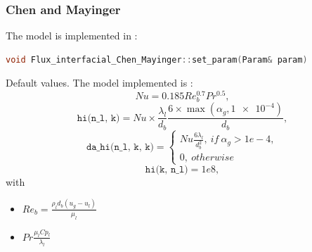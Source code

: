 \subsubsection{Chen and Mayinger}
The model is implemented in :
\begin{lstlisting}[language=c++]
void Flux_interfacial_Chen_Mayinger::set_param(Param& param)
\end{lstlisting}
Default values.
The model implemented is :
\begin{equation}
        Nu=0.185Re_b^{0.7}Pr^{0.5},
\end{equation}
\begin{equation}
    \texttt{hi(n_l, k)} = Nu\times\frac{\lambda_l}{d_b} \frac{6\times \max(\alpha_g,\num{1e-4})}{d_b},
\end{equation}
\begin{equation}
\texttt{da\_hi(n_l, k, k)}= \begin{cases}
    Nu \frac{6\lambda_l}{d_b^2},\ if\ \alpha_g> 1e-4,\\ 0,\ otherwise
\end{cases}
\end{equation}
\begin{equation}
\texttt{hi(k, n_l)} = 1e8,
\end{equation}
with
\begin{itemize}
    \item[\small \textcolor{blue}{\ding{109}}]$Re_b=\frac{\rho_l d_b (u_g-u_l)}{\mu_l}$
    \item[\small \textcolor{blue}{\ding{109}}]$Pr\frac{\mu_l Cp_l}{\lambda_l}$
\end{itemize}

